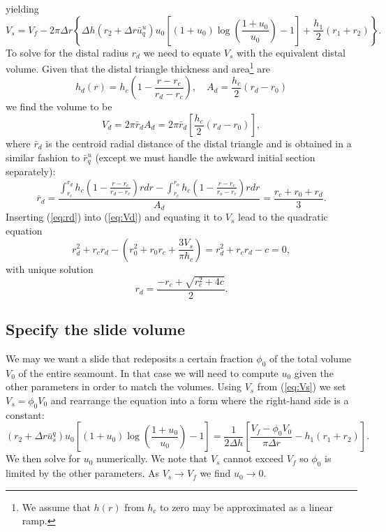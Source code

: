 \documentclass[12pt,letterpaper,margin=0.5in]{report}
\begin{document}
yielding
\begin{equation}
V_s = V_f - 2 \pi \Delta r \left \{ \Delta h \left ( r_2 + \Delta r\bar{u}_q^u \right ) u_0 \left [ (1 + u_0) \log \left (\frac{1 + u_0}{u_0} \right ) - 1 \right ] + \frac{h_1}{2} (r_1 + r_2) \right \}.
\label{eq:Vs}
\end{equation}
To solve for the distal radius $r_d$ we need to equate $V_s$ with the equivalent distal volume.
Given that the distal triangle thickness and area\footnote{We assume that $h(r)$ from $h_c$ to zero may be approximated as a linear ramp.} are
\begin{equation}
h_d(r) = h_c \left (1 - \frac{r - r_c}{r_d - r_c}\right ), \quad A_d = \frac{h_c}{2} (r_d - r_0)
\end{equation}
we find the volume to be
\begin{equation}
V_d = 2 \pi \bar{r}_d A_d = 2 \pi \bar{r}_d \left [ \frac{h_c}{2} (r_d - r_0) \right ],
\label{eq:Vd}
\end{equation}
where $\bar{r}_d$ is the centroid radial distance of the distal triangle and is obtained in a similar fashion to $\bar{r}_q^u$ (except
we must handle the awkward initial section separately):
\begin{equation}
\bar{r}_d = \frac{\int_{r_c}^{r_d}h_c \left (1 - \frac{r - r_c}{r_d - r_c} \right )rdr - \int_{r_c}^{r_o}h_c \left (1 - \frac{r - r_c}{r_o- r_c} \right )rdr}{A_d} = \frac{r_c + r_0 + r_d}{3}.
\label{eq:rd}
\end{equation}
Inserting (\ref{eq:rd}) into (\ref{eq:Vd}) and equating it to $V_s$ lead to the quadratic equation
\begin{equation}
r_d^2 + r_c r_d - \left (r_0^2 + r_0 r_c + \frac{3 V_s}{\pi h_c}\right ) = r_d^2 + r_c r_d - c = 0,
\end{equation}
with unique solution
\begin{equation}
r_d = \frac{-r_c + \sqrt{r_c^2 + 4c}}{2}.
\end{equation}

\subsection{Specify the slide volume}

We may we want a slide that redeposits a certain fraction $\phi_0$ of the total volume $V_0$ of the entire seamount. In that
case we will need to compute $u_0$ given the other parameters in order to match the volumes.  Using
$V_s$ from (\ref{eq:Vs}) we set $V_s = \phi_0 V_0$ and rearrange the equation into a form where the right-hand side is a constant:
\begin{equation}
\left ( r_2 + \Delta r \bar{u}_s^q \right ) u_0 \left [ (1 + u_0) \log \left (\frac{1 + u_0}{u_0} \right ) - 1 \right ] = \frac{1}{2\Delta h} \left [\frac{V_f - \phi_0 V_0}{\pi \Delta r} - h_1(r_1 + r_2) \right ].
\label{eq:u0}
\end{equation}
We then solve for $u_0$ numerically.  We note that $V_s$ cannot exceed $V_f$ so $\phi_0$ is limited by the other parameters.  As
$V_s \rightarrow V_f$ we find $u_0 \rightarrow 0$.
\end{document}
